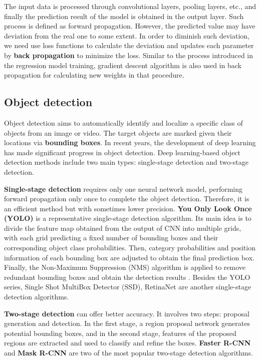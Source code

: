 The input data is processed through convolutional layers, pooling layers, etc., and finally the prediction result of the model is obtained in the output layer. Such process is defined as forward propagation. However, the predicted value may have deviation from the real one to some extent. In order to diminish such deviation, we need use loss functions to calculate the deviation and updates each parameter by \textbf{back propagation} to minimize the loss. Similar to the process introduced in the regression model training, gradient descent algorithm is also used in back propagation for calculating new weights in that procedure.

\subsection{Object detection}

Object detection aims to automatically identify and localize a specific class of objects from an image or video. The target objects are marked given their locations via \textbf{bounding boxes}. In recent years, the development of deep learning has made significant progress in object detection. Deep learning-based object detection methods include two main types: single-stage detection and two-stage detection.

\textbf{Single-stage detection} requires only one neural network model, performing forward propagation only once to complete the object detection. Therefore, it is an efficient method but with sometimes lower precision. \textbf{You Only Look Once (YOLO)} is a representative single-stage detection algorithm. Its main idea is to divide the feature map obtained from the output of CNN into multiple grids, with each grid predicting a fixed number of bounding boxes and their corresponding object class probabilities. Then, category probabilities and position information of each bounding box are adjusted to obtain the final prediction box. Finally, the Non-Maximum Suppression (NMS) algorithm is applied to remove redundant bounding boxes and obtain the detection results \cite{redmon2016you}. Besides the YOLO series, Single Shot MultiBox Detector (SSD), RetinaNet are another single-stage detection algorithms.

\textbf{Two-stage detection} can offer better accuracy. It involves two steps: proposal generation and detection. In the first stage, a region proposal network generates potential bounding boxes, and in the second stage, features of the proposed regions are extracted and used to classify and refine the boxes. \textbf{Faster R-CNN} and \textbf{Mask R-CNN} are two of the most popular two-stage detection algorithms.

